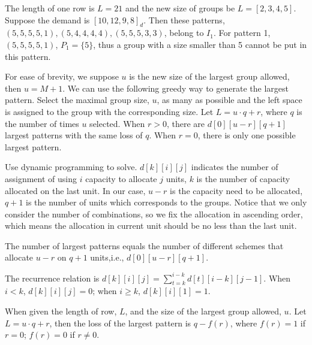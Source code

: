 \begin{example}
  The length of one row is $L = 21$ and the new size of groups be $L = [2, 3, 4, 5]$. Suppose the demand is $[10, 12, 9, 8]_d$. Then these patterns, $(5, 5, 5, 5, 1),(5, 4, 4, 4, 4),(5, 5, 5, 3, 3)$, belong to $I_1$. For pattern 1, $(5, 5, 5, 5, 1)$, $P_{1} = \{5\}$, thus a group with a size smaller than 5 cannot be put in this pattern.
\end{example}


For ease of brevity, we suppose $u$ is the new size of the largest group allowed, then $u = M+1$.
We can use the following greedy way to generate the largest pattern. Select the maximal group size, $u$, as many as possible and the left space is assigned to the group with the corresponding size. Let $L = u\cdot q + r$, where $q$ is the number of times $u$ selected. When $r>0$, there are $d[0][u-r][q+1]$ largest patterns with the same loss of $q$. When $r =0$, there is only one possible largest pattern.


Use dynamic programming to solve. $d[k][i][j]$ indicates the number of assignment of using $i$ capacity to allocate $j$ units, $k$ is the number of capacity allocated on the last unit. In our case, $u-r$ is the capacity need to be allocated, $q+1$ is the number of units which corresponds to the groups. Notice that we only consider the number of combinations, so we fix the allocation in ascending order, which means the allocation in current unit should be no less than the last unit.  

The number of largest patterns equals the number of different schemes that allocate $u-r$ on $q+1$ units,i.e., $d[0][u-r][q+1]$.

The recurrence relation is $d[k][i][j] = \sum_{t=k}^{i-k} d[t][i-k][j-1]$. 
When $i < k$, $d[k][i][j] =0$; when $i \geq k$, $d[k][i][1] =1$.

\begin{lem}
When given the length of row, $L$, and the size of the largest group allowed, $u$. Let $L = u\cdot q + r$, then the loss of the largest pattern is $q - f(r)$, where $f(r) =1$ if $r=0$; $f(r) =0$ if $r \neq 0$.
\end{lem}


